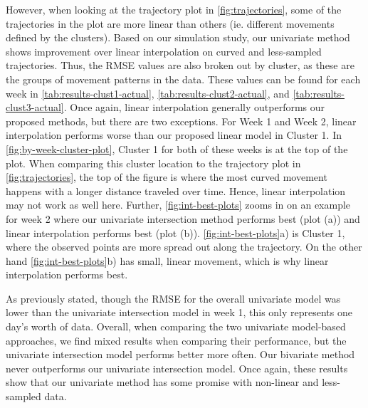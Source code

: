 \documentclass[12pt]{article}
\begin{document}
However, when looking at the trajectory plot in \cref{fig:trajectories},
some of the trajectories in the plot are more linear than others (ie.
different movements defined by the clusters). Based on our simulation
study, our univariate method shows improvement over linear interpolation
on curved and less-sampled trajectories. Thus, the RMSE values are also
broken out by cluster, as these are the groups of movement patterns in
the data. These values can be found for each week in
\cref{tab:results-clust1-actual}, \cref{tab:results-clust2-actual}, and
\cref{tab:results-clust3-actual}. Once again, linear interpolation
generally outperforms our proposed methods, but there are two
exceptions. For Week 1 and Week 2, linear interpolation performs worse
than our proposed linear model in Cluster 1. In
\cref{fig:by-week-cluster-plot}, Cluster 1 for both of these weeks is at
the top of the plot. When comparing this cluster location to the
trajectory plot in \cref{fig:trajectories}, the top of the figure is
where the most curved movement happens with a longer distance traveled
over time. Hence, linear interpolation may not work as well here.
Further, \cref{fig:int-best-plots} zooms in on an example for week 2
where our univariate intersection method performs best (plot (a)) and
linear interpolation performs best (plot (b)).
\cref{fig:int-best-plots}a) is Cluster 1, where the observed points are
more spread out along the trajectory. On the other hand
\cref{fig:int-best-plots}b) has small, linear movement, which is why
linear interpolation performs best.

As previously stated, though the RMSE for the overall univariate model
was lower than the univariate intersection model in week 1, this only
represents one day's worth of data. Overall, when comparing the two
univariate model-based approaches, we find mixed results when comparing
their performance, but the univariate intersection model performs better
more often. Our bivariate method never outperforms our univariate
intersection model. Once again, these results show that our univariate
method has some promise with non-linear and less-sampled data.
\end{document}

